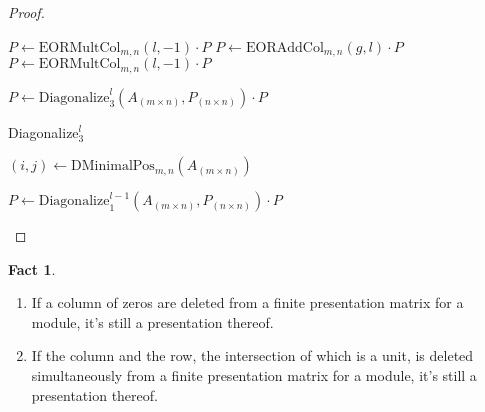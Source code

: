 \documentclass[10pt]{report}
\theoremstyle{definition}
\newtheorem{fact}{Fact}
\begin{document}
\begin{proof}
\begin{algorithm}[H]
{{    $P\gets\mathrm{EORMultCol}_{m,n}(l,-1)\cdot P$\;
    $P\gets\mathrm{EORAddCol}_{m,n}(g,l)\cdot P$\;
    $P\gets\mathrm{EORMultCol}_{m,n}(l,-1)\cdot P$\;

  }
}

$P\gets\mathrm{Diagonalize}^l_3(A_{(m\times n)},P_{(n\times n)})\cdot P$\;
\end{algorithm}

\begin{algorithm}[H]
\caption{Diagonalize$^l_3$}
\SetAlgoLined
{}
$(i,j)\gets\mathrm{DMinimalPos}_{m,n}(A_{(m\times n)})$\;

$P\gets\mathrm{Diagonalize}^{l-1}_1(A_{(m\times n)},P_{(n\times n)})\cdot P$\;
\end{algorithm}
\end{proof}

\begin{fact}\leavevmode\label{fact:still_presentation}
\begin{enumerate}
\item If a column of zeros are deleted from a finite presentation matrix for a module, it's still a presentation thereof.
\item If the column and the row, the intersection of which is a unit, is deleted simultaneously from a finite presentation matrix for a module, it's still a presentation thereof.
\end{enumerate}
\end{fact}
\end{document}
